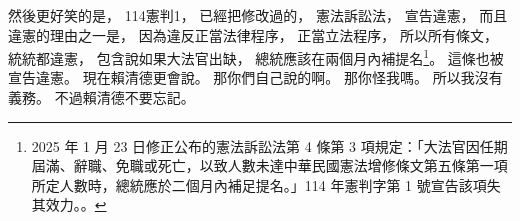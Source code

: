 \hypertarget{w01:cue:1287}{}然後更好笑的是，
\hypertarget{w01:cue:1288}{}114憲判1，
\hypertarget{w01:cue:1289}{}已經把修改過的，
\hypertarget{w01:cue:1290}{}憲法訴訟法，
\hypertarget{w01:cue:1291}{}宣告違憲，
\hypertarget{w01:cue:1292}{}而且違憲的理由之一是，
\hypertarget{w01:cue:1293}{}因為違反正當法律程序，
\hypertarget{w01:cue:1294}{}正當立法程序，
\hypertarget{w01:cue:1295}{}所以所有條文，
\hypertarget{w01:cue:1296}{}統統都違憲，
\hypertarget{w01:cue:1297}{}包含說如果大法官出缺，
\hypertarget{w01:cue:1298}{}總統應該在兩個月內補提名\footnote{2025 年 1 月 23 日修正公布的憲法訴訟法第 4 條第 3 項規定：「大法官因任期屆滿、辭職、免職或死亡，以致人數未達中華民國憲法增修條文第五條第一項所定人數時，總統應於二個月內補足提名。」114 年憲判字第 1 號宣告該項失其效力。\cite{ccj114-1}。}。
\hypertarget{w01:cue:1299}{}這條也被宣告違憲。
\hypertarget{w01:cue:1300}{}現在賴清德更會說。
\hypertarget{w01:cue:1301}{}那你們自己說的啊。
\hypertarget{w01:cue:1302}{}那你怪我嗎。
\hypertarget{w01:cue:1303}{}所以我沒有義務。
\hypertarget{w01:cue:1304}{}不過賴清德不要忘記。

